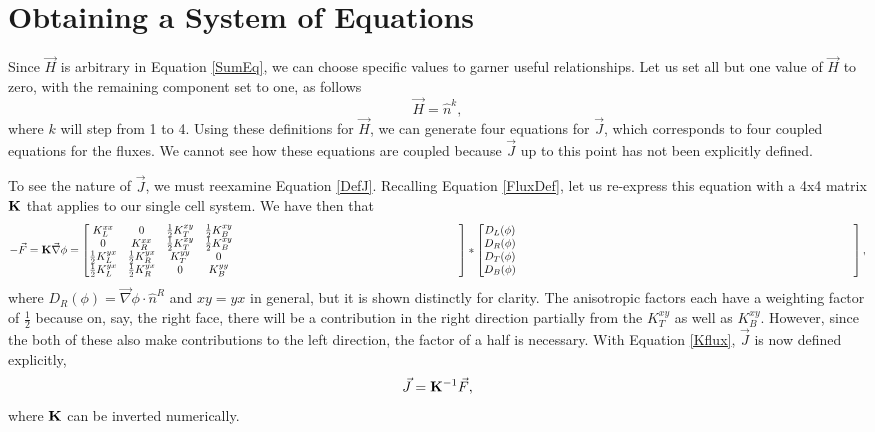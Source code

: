 \documentclass[11pt,letterpaper,oneside,notitlepage]{article}	%
\newcommand{\del}{\vec\nabla}				%
\newcommand{\eq}[1]{Equation \eqref{#1}}		%
\newcommand{\pindent}[1]{\hspace{6mm}}  		%
\numberwithin{equation}{section}				%
\begin{document}
\section{Obtaining a System of Equations}%
\pindent{}Since $\vec H$ is arbitrary in \eq{SumEq}, we can choose specific values to garner useful relationships. Let us set all but one value of $\vec H$ to zero, with the remaining component set to one, as follows
\begin{equation*} \vec H=\hat n^k ,\end{equation*}
where $k$ will step from 1 to 4.  Using these definitions for $\vec H$, we can generate four equations for $\vec J$, which corresponds to four coupled equations for the fluxes. We cannot see how these equations are coupled because $\vec J$ up to this point has not been explicitly defined.

To see the nature of $\vec J$, we must reexamine \eq{DefJ}. Recalling \eq{FluxDef}, let us re-express this equation with a 4x4 matrix $\bf K$ that applies to our single cell system.  We have then that
\begin{equation}
-\vec F = {\bf K} \del\phi = \begin{bmatrix}
K_L^{xx} & 0 & \tfrac{1}{2}K_T^{xy} & \tfrac{1}{2}K_B^{xy}	\\
\noalign{\:} %
0 & K_R^{xx}  & \tfrac{1}{2}K_T^{xy} & \tfrac{1}{2}K_B^{xy}	\\
\noalign{\:} %
\tfrac{1}{2}K_L^{yx} & \tfrac{1}{2}K_R^{yx} & K_T^{yy} & 0	\\
\noalign{\:} %
\tfrac{1}{2}K_L^{yx} & \tfrac{1}{2}K_R^{yx} & 0 & K_B^{yy}
\end{bmatrix}
*\begin{bmatrix}
D_L(\phi) \\\noalign{\:} D_R(\phi) \\\noalign{\:} D_T(\phi) \\\noalign{\:} D_B(\phi)
\end{bmatrix} \label{Kflux}
,\end{equation}
where $D_R(\phi)=\del\phi\cdot\hat n^R$ and $xy=yx$ in general, but it is shown distinctly for clarity. The anisotropic factors each have a weighting factor of $\frac{1}{2}$ because on, say, the right face, there will be a contribution in the right direction partially from the $K_T^{xy}$ as well as $K_B^{xy}$. However, since the both of these also make contributions to the left direction, the factor of a half is necessary.
With \eq{Kflux}, $\vec J$ is now defined explicitly, 
\begin{equation}
\vec J = {\bf K}^{-1}\vec F
,\end{equation}
where $\bf K$ can be inverted numerically.
\end{document}
